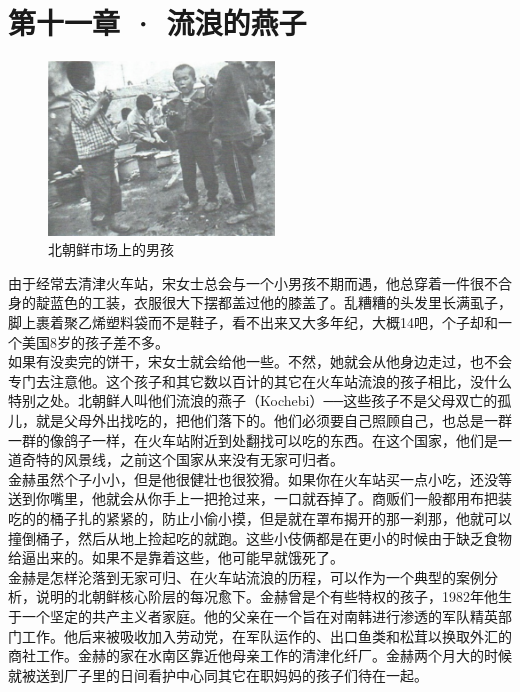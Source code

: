 \fancyhead[RO]{\thepage}
\fancyhead[LE]{\thepage}
\fancyfoot[LE,RO]{}
\fancyfoot[LO,CE]{}
\fancyfoot[CO,RE]{}
\chapter*{第十一章 · 流浪的燕子}
\begin{figure}[!htbp]
	\centering
	\includegraphics[width=6cm]{./Chapters/Images/11.jpg}
	\caption*{北朝鲜市场上的男孩}
\end{figure}


由于经常去清津火车站，宋女士总会与一个小男孩不期而遇，他总穿着一件很不合身的靛蓝色的工装，衣服很大下摆都盖过他的膝盖了。乱糟糟的头发里长满虱子，脚上裹着聚乙烯塑料袋而不是鞋子，看不出来又大多年纪，大概14吧，个子却和一个美国8岁的孩子差不多。\\

如果有没卖完的饼干，宋女士就会给他一些。不然，她就会从他身边走过，也不会专门去注意他。这个孩子和其它数以百计的其它在火车站流浪的孩子相比，没什么特别之处。北朝鲜人叫他们流浪的燕子（Kochebi）──这些孩子不是父母双亡的孤儿，就是父母外出找吃的，把他们落下的。他们必须要自己照顾自己，也总是一群一群的像鸽子一样，在火车站附近到处翻找可以吃的东西。在这个国家，他们是一道奇特的风景线，之前这个国家从来没有无家可归者。\\

金赫虽然个子小小，但是他很健壮也很狡猾。如果你在火车站买一点小吃，还没等送到你嘴里，他就会从你手上一把抢过来，一口就吞掉了。商贩们一般都用布把装吃的的桶子扎的紧紧的，防止小偷小摸，但是就在罩布揭开的那一刹那，他就可以撞倒桶子，然后从地上捡起吃的就跑。这些小伎俩都是在更小的时候由于缺乏食物给逼出来的。如果不是靠着这些，他可能早就饿死了。\\

金赫是怎样沦落到无家可归、在火车站流浪的历程，可以作为一个典型的案例分析，说明的北朝鲜核心阶层的每况愈下。金赫曾是个有些特权的孩子，1982年他生于一个坚定的共产主义者家庭。他的父亲在一个旨在对南韩进行渗透的军队精英部门工作。他后来被吸收加入劳动党，在军队运作的、出口鱼类和松茸以换取外汇的商社工作。金赫的家在水南区靠近他母亲工作的清津化纤厂。金赫两个月大的时候就被送到厂子里的日间看护中心同其它在职妈妈的孩子们待在一起。\\

